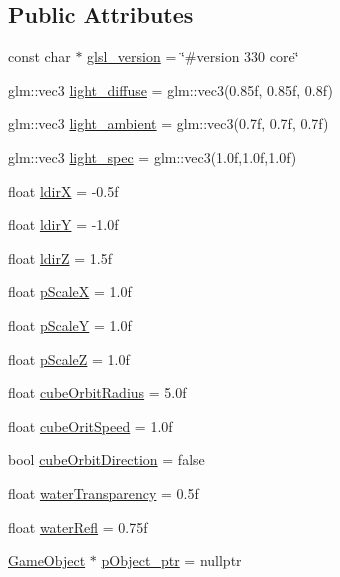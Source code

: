 \subsection*{Public Attributes}
\begin{DoxyCompactItemize}
\item 
const char $\ast$ \mbox{\hyperlink{class_game_aaa8f957ef3a7b9a386f950ff1f6f89ef}{glsl\+\_\+version}} = \char`\"{}\#version 330 core\char`\"{}
\item 
glm\+::vec3 \mbox{\hyperlink{class_game_ad6c83fd9cb6b646a09a5c07a0d2f4127}{light\+\_\+diffuse}} = glm\+::vec3(0.\+85f, 0.\+85f, 0.\+8f)
\item 
glm\+::vec3 \mbox{\hyperlink{class_game_ab59fa6e482623110a011d5319e40bc04}{light\+\_\+ambient}} = glm\+::vec3(0.\+7f, 0.\+7f, 0.\+7f)
\item 
glm\+::vec3 \mbox{\hyperlink{class_game_a600d2f3f0a0407010eb46640d2157290}{light\+\_\+spec}} = glm\+::vec3(1.\+0f,1.\+0f,1.\+0f)
\item 
float \mbox{\hyperlink{class_game_a1b522d1c1f329aca47be60f3db2d9056}{ldirX}} = -\/0.\+5f
\item 
float \mbox{\hyperlink{class_game_ab1dba5d397b75fe389f0a2569c6d2a09}{ldirY}} = -\/1.\+0f
\item 
float \mbox{\hyperlink{class_game_a9c84b35a1a322b8193c8d1443ace58c1}{ldirZ}} = 1.\+5f
\item 
float \mbox{\hyperlink{class_game_a7ceb6c09bd7968b1cbfd949de3c53d73}{p\+ScaleX}} = 1.\+0f
\item 
float \mbox{\hyperlink{class_game_abb3c306f0ca519ca040562c6b85f49a1}{p\+ScaleY}} = 1.\+0f
\item 
float \mbox{\hyperlink{class_game_a049182cd8a977e566235e10855418a82}{p\+ScaleZ}} = 1.\+0f
\item 
float \mbox{\hyperlink{class_game_a2b87cb2d287ad76c001515f10de5a257}{cube\+Orbit\+Radius}} = 5.\+0f
\item 
float \mbox{\hyperlink{class_game_ab28799b678dfa0b4813d101931a59b1d}{cube\+Orit\+Speed}} = 1.\+0f
\item 
bool \mbox{\hyperlink{class_game_a5f78e2edc6fead54dac8acd2f0126d87}{cube\+Orbit\+Direction}} = false
\item 
float \mbox{\hyperlink{class_game_a1d2ebf9d3a73b5e032de84a9d9aa6d53}{water\+Transparency}} = 0.\+5f
\item 
float \mbox{\hyperlink{class_game_a61286f3abaf4d831fd5a5e681058e37a}{water\+Refl}} = 0.\+75f
\item 
\mbox{\hyperlink{class_game_object}{Game\+Object}} $\ast$ \mbox{\hyperlink{class_game_a67c299035a53da108a53752997d1a79b}{p\+Object\+\_\+ptr}} = nullptr

\end{DoxyCompactItemize}
